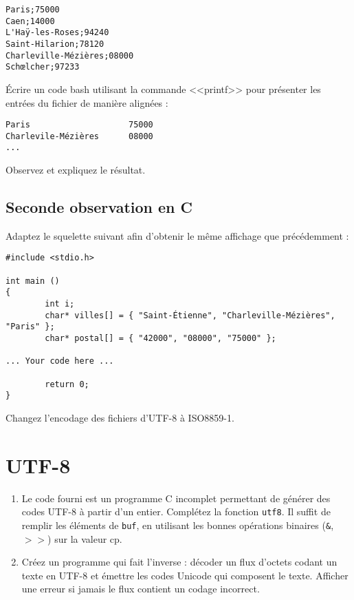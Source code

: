 \documentclass[11pt]{article}
\begin{document}
\begin{verbatim}
Paris;75000
Caen;14000
L'Haÿ-les-Roses;94240
Saint-Hilarion;78120
Charleville-Mézières;08000
Schœlcher;97233
\end{verbatim}

Écrire un code bash utilisant la commande <<printf>> pour présenter les entrées du fichier de manière alignées :

\begin{verbatim}
Paris                    75000
Charlevile-Mézières      08000
...
\end{verbatim}

Observez et expliquez le résultat.

\subsection{Seconde observation en C}

Adaptez le squelette suivant afin d'obtenir le même affichage que précédemment :

\begin{verbatim}
#include <stdio.h>

int main ()
{
        int i;
        char* villes[] = { "Saint-Étienne", "Charleville-Mézières", "Paris" };
        char* postal[] = { "42000", "08000", "75000" };

... Your code here ...

        return 0;
}
\end{verbatim}

Changez l'encodage des fichiers d'UTF-8 à ISO8859-1.



\section{UTF-8}                                                                                                                                                                                                                                                

\begin{enumerate}

\item Le code fourni est un programme C incomplet permettant de générer des
codes UTF-8 à partir d'un entier. Complétez la fonction \texttt{utf8}. Il
suffit de remplir les éléments de \texttt{buf}, en utilisant les bonnes
opérations binaires (\texttt{\&}, \texttt{$>>$}) sur la valeur cp.

\item Créez un programme qui fait l'inverse : décoder un flux d'octets codant
un texte en UTF-8 et émettre les codes Unicode qui composent le texte. Afficher
une erreur si jamais le flux contient un codage incorrect.
\end{enumerate}

\end{document}
